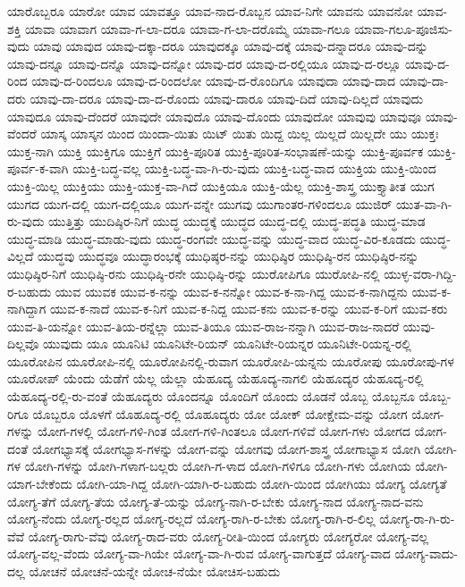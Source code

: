 {ಯಾರೊಬ್ಬರೂ
ಯಾರೋ
ಯಾವ
ಯಾವತ್ತೂ
ಯಾವ-ನಾದ-ರೊಬ್ಬನ
ಯಾವ-ನಿಗೇ
ಯಾವನು
ಯಾವನೋ
ಯಾವ-ಶಕ್ತಿ
ಯಾವಾ
ಯಾವಾಗ
ಯಾವಾ-ಗ-ಲಾ-ದರೂ
ಯಾವಾ-ಗ-ಲಾ-ದರೊಮ್ಮೆ
ಯಾವಾ-ಗಲೂ
ಯಾವಾ-ಗಲೂ-ಪೂಜಿಸು-ವುದು
ಯಾವು
ಯಾವುದ
ಯಾವು-ದಕ್ಕಾ-ದರೂ
ಯಾವುದಕ್ಕೂ
ಯಾವು-ದಕ್ಕೆ
ಯಾವು-ದನ್ನಾದರೂ
ಯಾವು-ದನ್ನು
ಯಾವು-ದನ್ನೂ
ಯಾವು-ದನ್ನೊ
ಯಾವು-ದನ್ನೋ
ಯಾವು-ದರ
ಯಾವು-ದ-ರಲ್ಲಿಯೂ
ಯಾವು-ದ-ರಲ್ಲೂ
ಯಾವು-ದ-ರಿಂದ
ಯಾವು-ದ-ರಿಂದಲೂ
ಯಾವು-ದ-ರಿಂದಲೋ
ಯಾವು-ದ-ರೊಂದಿಗೂ
ಯಾವುದಾ
ಯಾವು-ದಾದ
ಯಾವು-ದಾ-ದರು
ಯಾವು-ದಾ-ದರೂ
ಯಾವು-ದಾ-ದ-ರೊಂದು
ಯಾವು-ದಾರೂ
ಯಾವು-ದಿದೆ
ಯಾವು-ದಿಲ್ಲದೆ
ಯಾವುದು
ಯಾವುದೂ
ಯಾವು-ದೆಂದರೆ
ಯಾವುದೇ
ಯಾವುದೊ
ಯಾವು-ದೊಂದು
ಯಾವುದೋ
ಯಾವುವು
ಯಾವುವೂ
ಯಾವು-ವೆಂದರೆ
ಯಾಸ್ಕ
ಯಾಸ್ಕನ
ಯಿಂದ
ಯಿಂದಾ-ಯಿತು
ಯಿಟ್
ಯಿತು
ಯಿದ್ದ
ಯಿಲ್ಲ
ಯಿಲ್ಲದೆ
ಯಿಲ್ಲದೇ
ಯು
ಯುಕ್ತಃ
ಯುಕ್ತ-ನಾಗಿ
ಯುಕ್ತಿ
ಯುಕ್ತಿಗೂ
ಯುಕ್ತಿಗೆ
ಯುಕ್ತಿ-ಪೂರಿತ
ಯುಕ್ತಿ-ಪೂರಿತ-ಸಂಭಾಷಣೆ-ಯನ್ನು
ಯುಕ್ತಿ-ಪೂರ್ವಕ
ಯುಕ್ತಿ-ಪೂರ್ವ-ಕ-ವಾಗಿ
ಯುಕ್ತಿ-ಬದ್ಧ-ವಲ್ಲ
ಯುಕ್ತಿ-ಬದ್ಧ-ವಾ-ಗಿ-ರು-ವುದು
ಯುಕ್ತಿ-ಬದ್ಧ-ವಾದ
ಯುಕ್ತಿಯ
ಯುಕ್ತಿ-ಯಿಂದ
ಯುಕ್ತಿ-ಯಿಲ್ಲ
ಯುಕ್ತಿಯು
ಯುಕ್ತಿ-ಯುಕ್ತ-ವಾ-ಗಿದೆ
ಯುಕ್ತಿಯೂ
ಯುಕ್ತಿ-ಯೆಲ್ಲ
ಯುಕ್ತಿ-ಶಾಸ್ತ್ರ
ಯುಕ್ತ್ಯಾತೀತ
ಯುಗ
ಯುಗದ
ಯುಗ-ದಲ್ಲಿ
ಯುಗ-ದಲ್ಲಿಯೂ
ಯುಗ-ವನ್ನೇ
ಯುಗವು
ಯುಗಾಂತರ-ಗಳಿಂದಲೂ
ಯುಜಿರ್
ಯುತ-ವಾ-ಗಿ-ರು-ವುದು
ಯುತ್ತಿತ್ತು
ಯುದಿಷ್ಠಿರ-ನಿಗೆ
ಯುದ್ಧ
ಯುದ್ಧಕ್ಕೆ
ಯುದ್ಧದ
ಯುದ್ಧ-ದಲ್ಲಿ
ಯುದ್ಧ-ಪದ್ಧತಿ
ಯುದ್ಧ-ಮಾಡ
ಯುದ್ಧ-ಮಾಡಿ
ಯುದ್ಧ-ಮಾಡು-ವುದು
ಯುದ್ಧ-ರಂಗವೇ
ಯುದ್ಧ-ವನ್ನು
ಯುದ್ಧ-ವಾದ
ಯುದ್ಧ-ವಿರ-ಕೂಡದು
ಯುದ್ಧ-ವಿಲ್ಲದೆ
ಯುದ್ಧವು
ಯುದ್ಧವೂ
ಯುದ್ಧಾರಂಭಕ್ಕೆ
ಯುಧಿಷ್ಠರ-ನನ್ನು
ಯುಧಿಷ್ಠಿರ
ಯುಧಿಷ್ಠಿ-ರನ
ಯುಧಿಷ್ಠಿರ-ನನ್ನು
ಯುಧಿಷ್ಠಿರ-ನಿಗೆ
ಯುಧಿಷ್ಠಿ-ರನು
ಯುಧಿಷ್ಠಿ-ರನೇ
ಯುಧಿಷ್ಠಿ-ರನ್ನು
ಯುರೋಪಿಗೂ
ಯುರೋಪಿ-ನಲ್ಲಿ
ಯುಳ್ಳ-ವರಾ-ಗಿದ್ದಿ-ರ-ಬಹುದು
ಯುವ
ಯುವಕ
ಯುವ-ಕ-ನನ್ನು
ಯುವ-ಕ-ನನ್ನೋ
ಯುವ-ಕ-ನಾ-ಗಿದ್ದ
ಯುವ-ಕ-ನಾಗಿದ್ದನು
ಯುವ-ಕ-ನಾಗಿದ್ದಾಗ
ಯುವ-ಕ-ನಾದೆ
ಯುವ-ಕ-ನಿಗೆ
ಯುವ-ಕ-ನಿದ್ದ
ಯುವ-ಕನು
ಯುವ-ಕ-ರನ್ನು
ಯುವ-ಕ-ರಿಗೆ
ಯುವ-ಕರು
ಯುವ-ತಿ-ಯನ್ನೋ
ಯುವ-ತಿಯ-ರನ್ನೆಲ್ಲಾ
ಯುವ-ತಿಯೂ
ಯುವ-ರಾಜ-ನನ್ನಾಗಿ
ಯುವ-ರಾಜ-ನಾದರೆ
ಯುವು-ದಿಲ್ಲವೊ
ಯುವುದು
ಯೂ
ಯೂನಿಟಿ
ಯೂನಿಟೇ-ರಿಯನ್
ಯೂನಿಟೇ-ರಿಯನ್ನರ
ಯೂನಿಟೇ-ರಿಯನ್ನ-ರಲ್ಲಿ
ಯೂರೋಪಿನ
ಯೂರೋಪಿ-ನಲ್ಲಿ
ಯೂರೋಪಿನಲ್ಲಿ-ರುವಾಗ
ಯೂರೋಪಿ-ಯನ್ನನು
ಯೂರೋಪು
ಯೂರೋಪು-ಗಳ
ಯೂರೋಪ್
ಯೆಂದು
ಯೆಡೆಗೆ
ಯೆಲ್ಲ
ಯೆಲ್ಲಾ
ಯೆಹೂದ್ಯ
ಯೆಹೂದ್ಯ-ನಾಗಲಿ
ಯೆಹೂದ್ಯರ
ಯೆಹೂದ್ಯ-ರಲ್ಲಿ
ಯೆಹೂದ್ಯ-ರಲ್ಲಿ-ರು-ವಂತೆ
ಯೆಹೂದ್ಯರು
ಯೊಂದನ್ನೂ
ಯೊಂದಿಗೆ
ಯೊಂದು
ಯೊಡನೆ
ಯೊಬ್ಬ
ಯೊಬ್ಬನೂ
ಯೊಬ್ಬ-ರಿಗೂ
ಯೊಬ್ಬರೂ
ಯೊಳಗೆ
ಯೊಹೂದ್ಯ-ರಲ್ಲಿ
ಯೊಹೂದ್ಯರು
ಯೋ
ಯೋಕ್
ಯೋಕ್ಷೇಮ-ವನ್ನು
ಯೋಗ
ಯೋಗ-ಗಳನ್ನು
ಯೋಗ-ಗಳಲ್ಲಿ
ಯೋಗ-ಗಳಿ-ಗಿಂತ
ಯೋಗ-ಗಳಿ-ಗಿಂತಲೂ
ಯೋಗ-ಗಳಿವೆ
ಯೋಗ-ಗಳು
ಯೋಗದ
ಯೋಗ-ದಂತೆ
ಯೋಗಭ್ಯಾಸಕ್ಕೆ
ಯೋಗಭ್ಯಾಸ-ಗಳನ್ನು
ಯೋಗ-ವನ್ನು
ಯೋಗವು
ಯೋಗ-ಶಾಸ್ತ್ರ
ಯೋಗಾಭ್ಯಾಸ
ಯೋಗಿ
ಯೋಗಿ-ಗಳ
ಯೋಗಿ-ಗಳನ್ನು
ಯೋಗಿ-ಗಳಾಗ-ಬಲ್ಲರು
ಯೋಗಿ-ಗ-ಳಾದ
ಯೋಗಿ-ಗಳಿಗೂ
ಯೋಗಿ-ಗಳು
ಯೋಗಿಯ
ಯೋಗಿ-ಯಾಗ-ಬೇಕೆಂದು
ಯೋಗಿ-ಯಾ-ಗಿದ್ದ
ಯೋಗಿ-ಯಾಗಿ-ರ-ಬಹುದು
ಯೋಗಿ-ಯಿಂದ
ಯೋಗಿಯು
ಯೋಗ್ಯ
ಯೋಗ್ಯತೆ
ಯೋಗ್ಯ-ತೆಗೆ
ಯೋಗ್ಯ-ತೆಯ
ಯೋಗ್ಯ-ತೆ-ಯನ್ನು
ಯೋಗ್ಯ-ನಾಗಿ-ರ-ಬೇಕು
ಯೋಗ್ಯ-ನಾದ
ಯೋಗ್ಯ-ನಾದ-ವನು
ಯೋಗ್ಯ-ನೆಂದು
ಯೋಗ್ಯ-ರಲ್ಲದ
ಯೋಗ್ಯ-ರಲ್ಲದೆ
ಯೋಗ್ಯ-ರಾಗಿ-ರ-ಬೇಕು
ಯೋಗ್ಯ-ರಾಗಿ-ರ-ಲಿಲ್ಲ
ಯೋಗ್ಯ-ರಾ-ಗಿ-ರು-ವೆವೆ
ಯೋಗ್ಯ-ರಾಗು-ವೆವು
ಯೋಗ್ಯ-ರಾದ-ವರು
ಯೋಗ್ಯ-ರೀತಿ-ಯಿಂದ
ಯೋಗ್ಯರು
ಯೋಗ್ಯರೋ
ಯೋಗ್ಯ-ವಲ್ಲ
ಯೋಗ್ಯ-ವಲ್ಲ-ವೆಂದು
ಯೋಗ್ಯ-ವಾ-ಗಿಯೇ
ಯೋಗ್ಯ-ವಾ-ಗಿ-ರುವ
ಯೋಗ್ಯ-ವಾಗುತ್ತದೆ
ಯೋಗ್ಯ-ವಾದ
ಯೋಗ್ಯ-ವಾದು-ದಲ್ಲ
ಯೋಚನೆ
ಯೋಚನೆ-ಯನ್ನೇ
ಯೋಚ-ನೆಯೇ
ಯೋಚಿಸ-ಬಹುದು
}

